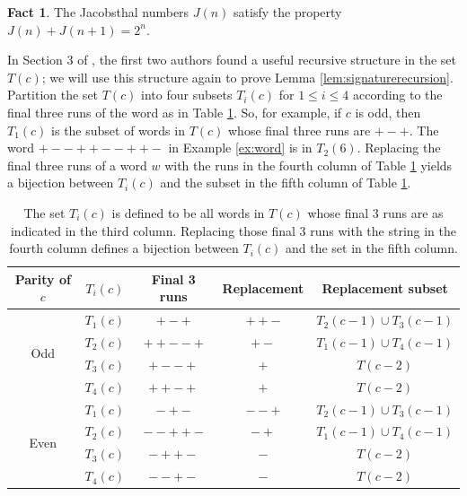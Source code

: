 \documentclass[12pt]{amsart}
\theoremstyle{definition}
\newtheorem{fact}[theorem]{Fact}
\theoremstyle{remark}
\numberwithin{equation}{section}
\begin{document}
\begin{fact}
\label{fact:Jn}
The Jacobsthal numbers $J(n)$ satisfy the property $J(n)+J({n+1})=2^n$.
\end{fact}

In Section 3 of \cite{CohLow}, the first two authors found a useful recursive structure in the set $T(c)$; we will use this structure again to prove Lemma \ref{lem:signaturerecursion}.  Partition the set $T(c)$ into four subsets $T_i(c)$ for $1\leq i\leq 4$ according to the final three runs of the word as in Table \ref{tab:bijection}. So, for example, if $c$ is odd, then $T_1(c)$ is the subset of words in $T(c)$ whose final three runs are $+-+$.  The word $+--++--++-$ in Example \ref{ex:word} is in $T_2(6)$. Replacing the final three runs of a word $w$ with the runs in the fourth column of Table \ref{tab:bijection} yields a bijection between $T_i(c)$ and the subset in the fifth column of Table \ref{tab:bijection}.

\begin{table}[h]
    \begin{tabular}{|c|c|c|c|c|}
    \hline
    Parity of $c$ & $T_i(c)$ & Final 3 runs & Replacement & Replacement subset\\
    \hline
    \multirow{4}{*}{Odd} & $T_1(c)$ &  $+-+$ & $++-$ & $T_2(c-1)\cup T_3(c-1)$\\
    \cline{2-5}
     & $T_2(c)$ & $++--+$ & $+-$ & $T_1(c-1)\cup T_4(c-1)$\\
    \cline{2-5}
     & $T_3(c)$ & $+--+$ & $+$ & $T(c-2)$\\
    \cline{2-5}
     & $T_4(c)$ & $++-+$ & $+$ & $T(c-2)$\\
    \hline
    \multirow{4}{*}{Even} & $T_1(c)$ &  $-+-$ & $--+$ & $T_2(c-1)\cup T_3(c-1)$\\
    \cline{2-5}
     & $T_2(c)$ & $--++-$ & $-+$ & $T_1(c-1)\cup T_4(c-1)$\\
    \cline{2-5}
     & $T_3(c)$ & $-++-$ & $-$ & $T(c-2)$\\
    \cline{2-5}
     & $T_4(c)$ & $--+-$ & $-$ & $T(c-2)$\\
    \hline
    \end{tabular}
    \caption{The set $T_i(c)$ is defined to be all words in $T(c)$ whose final 3 runs are as indicated in the third column. Replacing those final 3 runs with the string in the fourth column defines a bijection between $T_i(c)$ and the set in the fifth column.}
    \label{tab:bijection}
\end{table}
\end{document}
